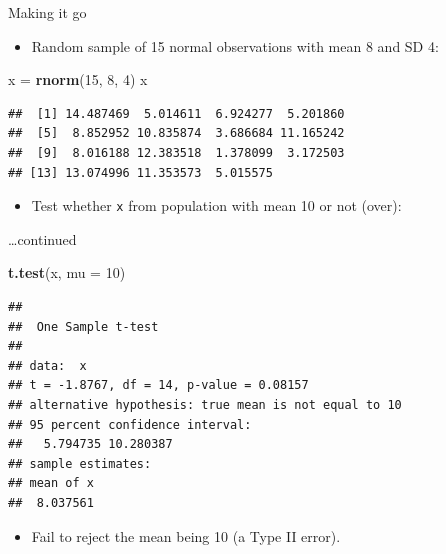 \documentclass[ignorenonframetext,]{beamer}
\newenvironment{Shaded}{\begin{snugshade}}{\end{snugshade}}
\newcommand{\DataTypeTok}[1]{\textcolor[rgb]{0.13,0.29,0.53}{#1}}
\newcommand{\DecValTok}[1]{\textcolor[rgb]{0.00,0.00,0.81}{#1}}
\newcommand{\KeywordTok}[1]{\textcolor[rgb]{0.13,0.29,0.53}{\textbf{#1}}}
\newcommand{\NormalTok}[1]{#1}
\newcommand{\StringTok}[1]{\textcolor[rgb]{0.31,0.60,0.02}{#1}}
\providecommand{\tightlist}{%
  \setlength{\itemsep}{0pt}\setlength{\parskip}{0pt}}
\begin{document}
\begin{frame}[fragile]{Making it go}
\protect\hypertarget{making-it-go}{}

\begin{itemize}
\tightlist
\item
  Random sample of 15 normal observations with mean 8 and SD 4:
\end{itemize}

\begin{Shaded}
\begin{Highlighting}[]
\NormalTok{x =}\StringTok{ }\KeywordTok{rnorm}\NormalTok{(}\DecValTok{15}\NormalTok{, }\DecValTok{8}\NormalTok{, }\DecValTok{4}\NormalTok{)}
\NormalTok{x}
\end{Highlighting}
\end{Shaded}

\begin{verbatim}
##  [1] 14.487469  5.014611  6.924277  5.201860
##  [5]  8.852952 10.835874  3.686684 11.165242
##  [9]  8.016188 12.383518  1.378099  3.172503
## [13] 13.074996 11.353573  5.015575
\end{verbatim}

\begin{itemize}
\tightlist
\item
  Test whether \texttt{x} from population with mean 10 or not (over):
\end{itemize}

\end{frame}

\begin{frame}[fragile]{\ldots{}continued}
\protect\hypertarget{continued}{}

\begin{Shaded}
\begin{Highlighting}[]
\KeywordTok{t.test}\NormalTok{(x, }\DataTypeTok{mu =} \DecValTok{10}\NormalTok{)}
\end{Highlighting}
\end{Shaded}

\begin{verbatim}
## 
##  One Sample t-test
## 
## data:  x
## t = -1.8767, df = 14, p-value = 0.08157
## alternative hypothesis: true mean is not equal to 10
## 95 percent confidence interval:
##   5.794735 10.280387
## sample estimates:
## mean of x 
##  8.037561
\end{verbatim}

\begin{itemize}
\tightlist
\item
  Fail to reject the mean being 10 (a Type II error).
\end{itemize}

\end{frame}
\end{document}

